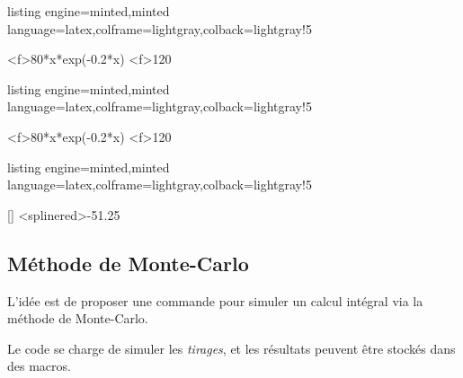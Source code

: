 \documentclass[11pt,a4paper]{ltxdoc}
\begin{document}
\begin{tcblisting}{listing engine=minted,minted language=latex,colframe=lightgray,colback=lightgray!5}
\begin{GraphiqueTikz}
	[x=0.66cm,y=0.033cm,Xmin=0,Xmax=21,Xgrille=2,Xgrilles=1,
	Ymin=0,Ymax=160,Ygrille=20,Ygrilles=10]
	{80*x*exp(-0.2*x)}
	{1}{20}
\end{GraphiqueTikz}
\end{tcblisting}

\begin{tcblisting}{listing engine=minted,minted language=latex,colframe=lightgray,colback=lightgray!5}
\begin{GraphiqueTikz}
	[x=0.66cm,y=0.033cm,Xmin=0,Xmax=21,Xgrille=2,Xgrilles=1,
	Ymin=0,Ymax=160,Ygrille=20,Ygrilles=10]
	{80*x*exp(-0.2*x)}
	{1}{20}
\end{GraphiqueTikz}
\end{tcblisting}

\begin{tcblisting}{listing engine=minted,minted language=latex,colframe=lightgray,colback=lightgray!5}
\begin{GraphiqueTikz}%
	[x=0.8cm,y=1cm,Xmin=-7,Xmax=4,Ymin=0,Ymax=5]
	[\lstsplineB]
	\DefinirCourbeSpline[Nom=splinered]{\lstsplineB}
	\TracerCourbeSpline[Couleur=red]{\lstsplineB}
	\RepresenterMethodeIntegrale[Methode=RectanglesMilieu,Spline,Couleur=teal]<splinered>{-5}{1.25}
\end{GraphiqueTikz}
\end{tcblisting}

\subsection{Méthode de Monte-Carlo}\label{montecarlo}

L'idée est de proposer une commande pour simuler un calcul intégral via la méthode de Monte-Carlo.

Le code se charge de simuler les \textit{tirages}, et les résultats peuvent être stockés dans des macros.
\end{document}
